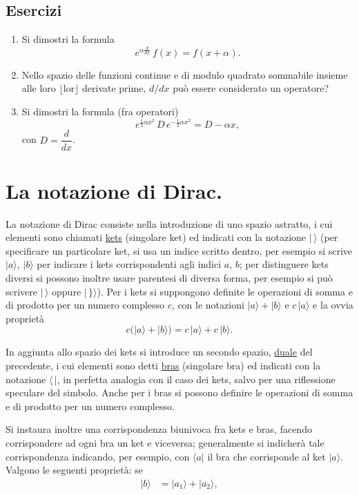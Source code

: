 \documentclass[11pt, a4paper]{book}
\numberwithin{equation}{section}
\newenvironment{esercizi}{\subsection*{Esercizi}\begin{enumerate}}{\end{enumerate}}
\begin{document}
\begin{esercizi}
\item[*] Si dimostri la formula
\[
e^{\alpha\frac{d}{dx}}\,f(x) = f(x+\alpha).
\]

\item Nello spazio delle funzioni continue e di modulo quadrato
sommabile insieme alle loro $\lfloor\text{lor}\rfloor$ derivate prime,
$d/dx$ può essere considerato un operatore?

\item Si dimostri la formula (fra operatori)
\[
e^{\frac{1}{2}\alpha x^2}\,D\,e^{-\frac{1}{2}\alpha x^2} = D - \alpha x,
\]
con $D = \dfrac{d}{dx}$.

\end{esercizi}

\section{La notazione di Dirac.}

La notazione di Dirac consiste nella introduzione di uno spazio
astratto, i cui elementi sono chiamati \underline{kets} (singolare ket)
ed indicati con la notazione $|\,\rangle$ (per specificare un particolare
ket, si usa un indice scritto dentro, per esempio si scrive $|a\rangle$,
$|b\rangle$ per indicare i kets corrispondenti agli indici $a$, $b$; per
distinguere kets diversi si possono inoltre usare parentesi di diversa
forma, per esempio si può scrivere $|\,\rangle$ oppure $|\,\}\rangle$).
Per i kets si suppongono definite le operazioni di somma e di prodotto
per un numero complesso $c$, con le notazioni $|a\rangle + |b\rangle$ e
$c\,|a\rangle$ e la ovvia proprietà
\begin{equation}
c\bigl(|a\rangle + |b\rangle\bigr) = c\,|a\rangle + c\,|b\rangle.
\end{equation}

In aggiunta allo spazio dei kets si introduce un secondo spazio,
\underline{duale} del precedente, i cui elementi sono detti
\underline{bras} (singolare bra) ed indicati con la notazione $\langle\,|$,
in perfetta analogia con il caso dei kets, salvo per una riflessione
speculare del simbolo. Anche per i bras si possono definire le operazioni
di somma e di prodotto per un numero complesso.

Si instaura inoltre una corrispondenza biunivoca fra kets e bras,
facendo corrispondere ad ogni bra un ket e viceversa; generalmente si
indicherà tale corrispondenza indicando, per esempio, con $\langle a|$
il bra che corrisponde al ket $|a\rangle$. Valgono le seguenti proprietà:
se
\begin{align}
|b\rangle &= |a_1\rangle + |a_2\rangle, \tag{2a}
\end{align}
\end{document}
